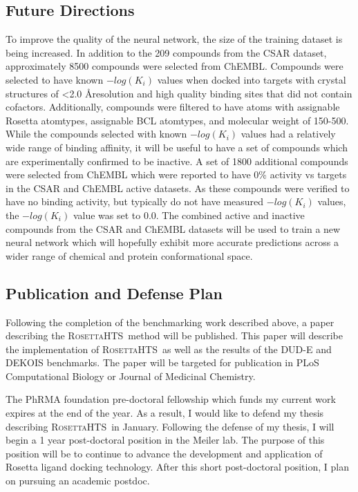 \documentclass[11pt, oneside]{article}   	%
\newcommand{\rhts}{\textsc{RosettaHTS}\ }
\begin{document}
\subsection{Future Directions}
To improve the quality of the neural network, the size of the training dataset is being increased.  
In addition to the 209 compounds from the CSAR dataset,  approximately 8500 compounds were selected from ChEMBL\citep{Gaulton:vaa}.
Compounds were selected to have known $-log(K_{i})$ values when docked into targets with crystal structures of \textless 2.0 \AA resolution and high quality binding sites that did not contain cofactors.
Additionally, compounds were filtered to have atoms with assignable Rosetta atomtypes, assignable BCL atomtypes, and molecular weight of 150-500.
While the compounds selected with known $-log(K_{i})$ values had a relatively wide range of binding affinity, it will be useful to have a set of compounds which are experimentally confirmed to be inactive.
A set of 1800 additional compounds were selected from ChEMBL which were reported to have 0\% activity vs targets in the CSAR and ChEMBL active datasets.
As these compounds were verified to have no binding activity, but typically do not have measured $-log(K_{i})$ values, the $-log(K_{i})$ value was set to 0.0. 
The combined active and inactive compounds from the CSAR and ChEMBL datasets will be used to train a new neural network which will hopefully exhibit more accurate predictions across a wider range of chemical and protein conformational space. 


\subsection{Publication and Defense Plan}
Following the completion of the benchmarking work described above, a paper describing the \rhts method will be published.
This paper will describe the implementation of \rhts as well as the results of the DUD-E and DEKOIS benchmarks.
The paper will be targeted for publication in PLoS Computational Biology or Journal of Medicinal Chemistry.

The PhRMA foundation pre-doctoral fellowship which funds my current work expires at the end of the year.  
As a result, I would like to defend my thesis describing \rhts in January. 
Following the defense of my thesis, I will begin a 1 year post-doctoral position in the Meiler lab.
The purpose of this position will be to continue to advance the development and application of Rosetta ligand docking technology.
After this short post-doctoral position, I plan on pursuing an academic postdoc. 



\end{document}
